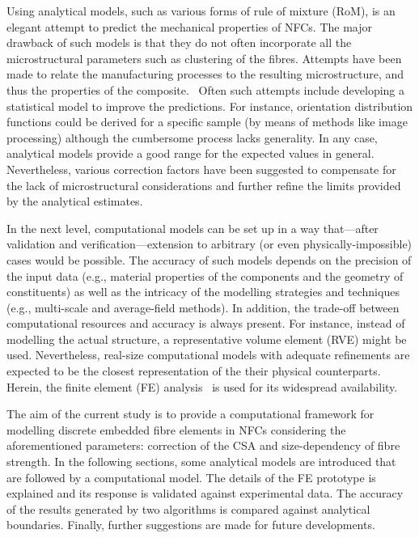 	Using analytical models, such as various forms of rule of mixture (RoM), is an elegant attempt to predict the mechanical properties of NFCs. The major drawback of such models is that they do not often incorporate all the microstructural parameters such as clustering of the fibres. Attempts have been made to relate the manufacturing processes to the resulting microstructure, and thus the properties of the composite.~\autocite{Summerscales.2017} Often such attempts include developing a statistical model to improve the predictions. For instance, orientation distribution functions could be derived for a specific sample (by means of methods like image processing) although the cumbersome process lacks generality. In any case, analytical models provide a good range for the expected values in general. Nevertheless, various correction factors have been suggested to compensate for the lack of microstructural considerations and further refine the limits provided by the analytical estimates.~\autocite{Summerscales.2013}
	
	In the next level, computational models can be set up in a way that---after validation and verification---extension to arbitrary (or even physically-impossible) cases would be possible. The accuracy of such models depends on the precision of the input data (e.g., material properties of the components and the geometry of constituents) as well as the intricacy of the  modelling strategies and techniques (e.g., multi-scale and average-field methods). In addition, the trade-off between computational resources and accuracy is always present. For instance, instead of modelling the actual structure, a representative volume element (RVE) might be used. Nevertheless, real-size computational models with adequate refinements are expected to be the closest representation of the their physical counterparts. Herein, the finite element (FE) analysis~\autocite{Oechsner.2016,Javanbakht.2018} is used for its widespread availability.
	
	The aim of the current study is to provide a computational framework for modelling discrete embedded fibre elements in NFCs considering the aforementioned parameters: correction of the CSA and size-dependency of fibre strength. In the following sections, some analytical models are introduced that are followed by a computational model. The details of the FE prototype is explained and its response is validated against experimental data. The accuracy of the results generated by two algorithms is compared against analytical boundaries. Finally, further suggestions are made for future developments.%
	
